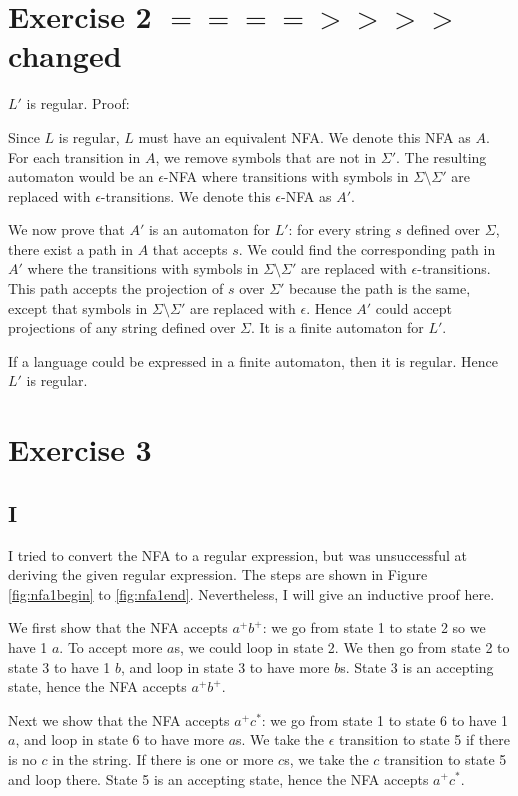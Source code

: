 \documentclass{article}
\begin{document}
\section*{Exercise 2 $====>>>>$ changed}
$L'$ is regular. Proof:

Since $L$ is regular, $L$ must have an
equivalent NFA. We denote this NFA as $A$. For each
transition in $A$, we remove symbols that are not
in $\Sigma'$. The resulting automaton would be an
$\epsilon$-NFA where transitions with symbols in
$\Sigma \setminus \Sigma'$ are replaced with
$\epsilon$-transitions. We denote this $\epsilon$-NFA
as $A'$.

We now prove that $A'$ is an automaton for
$L'$: for every string $s$ defined over
$\Sigma$, there exist a path in $A$ that
accepts $s$. We could find the corresponding path in
$A'$ where the transitions with symbols in
$\Sigma \setminus \Sigma'$ are replaced with $\epsilon$-transitions.
This path accepts the projection of $s$ over
$\Sigma'$ because the path is the same, except that symbols in
$\Sigma \setminus \Sigma'$ are replaced with $\epsilon$. Hence
$A'$ could accept projections of any string defined over
$\Sigma$. It is a finite automaton for $L'$.

If a language could be expressed in a finite automaton, then it is regular.
Hence $L'$ is regular.

\section*{Exercise 3}
\subsection*{I}
I tried to convert the NFA to a regular expression, but was unsuccessful at
deriving the given regular expression. The steps are shown in Figure
\ref{fig:nfa1begin} to \ref{fig:nfa1end}. Nevertheless, I will give an
inductive proof here.

We first show that the NFA accepts $a^+b^+$: we go from state 1
to state 2 so we have 1 $a$. To accept more
$a$s, we could loop in state 2. We then go from state 2 to
state 3 to have 1 $b$, and loop in state 3 to have more
$b$s. State 3 is an accepting state, hence the NFA accepts
$a^+b^+$.

Next we show that the NFA accepts $a^+c^*$: we go from state 1
to
state 6 to have 1 $a$, and loop in state 6 to have more
$a$s. We take the $\epsilon$ transition to
state
5 if there is no $c$ in the string. If there is one or more
$c$s, we take the $c$ transition to
state
5 and loop there. State 5 is an accepting state, hence the NFA accepts
$a^+c^*$.
\end{document}
